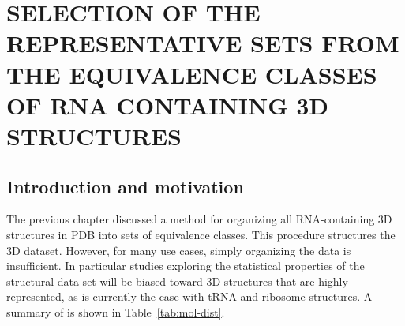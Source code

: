 \chapter{SELECTION OF THE REPRESENTATIVE SETS FROM THE EQUIVALENCE CLASSES OF
RNA CONTAINING 3D STRUCTURES}

\section{Introduction and motivation}

The previous chapter discussed a method for organizing all RNA-containing 3D
structures in PDB into sets of equivalence classes. This procedure structures
the 3D dataset. However, for many use cases, simply organizing the data is
insufficient. In particular studies exploring the statistical properties of the
structural data set will be biased toward 3D structures that are highly
represented, as is currently the case with tRNA and ribosome structures. A
summary of is shown in Table~\ref{tab:mol-dist}.

